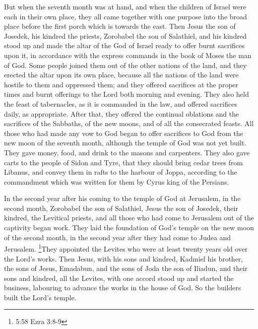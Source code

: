  But when the seventh month was at hand, and when the
children of Israel were each in their own place, they all came together
with one purpose into the broad place before the first porch which is
towards the east.  Then Jesus the son of Josedek, his
kindred the priests, Zorobabel the son of Salathiel, and his kindred
stood up and made the altar of the God of Israel ready  to
offer burnt sacrifices upon it, in accordance with the express commands
in the book of Moses the man of God.  Some people joined
them out of the other nations of the land, and they erected the altar
upon its own place, because all the nations of the land were hostile to
them and oppressed them; and they offered sacrifices at the proper times
and burnt offerings to the Lord both morning and evening. 
They also held the feast of tabernacles, as it is commanded in the law,
and offered sacrifices daily, as appropriate.  After that,
they offered the continual oblations and the sacrifices of the Sabbaths,
of the new moons, and of all the consecrated feasts.  All
those who had made any vow to God began to offer sacrifices to God from
the new moon of the seventh month, although the temple of God was not
yet built.  They gave money, food, and drink to the masons
and carpenters.  They also gave carts to the people of
Sidon and Tyre, that they should bring cedar trees from Libanus, and
convey them in rafts to the harbour of Joppa, according to the
commandment which was written for them by Cyrus king of the Persians.

 In the second year after his coming to the temple of God
at Jerusalem, in the second month, Zorobabel the son of Salathiel, Jesus
the son of Josedek, their kindred, the Levitical priests, and all those
who had come to Jerusalem out of the captivity began work. 
They laid the foundation of God's temple on the new moon of the second
month, in the second year after they had come to Judea and Jerusalem.
 \footnote{5:58 Ezra 3:8-9}They appointed the Levites who
were at least twenty years old over the Lord's works. Then Jesus, with
his sons and kindred, Kadmiel his brother, the sons of Jesus, Emadabun,
and the sons of Joda the son of Iliadun, and their sons and kindred, all
the Levites, with one accord stood up and started the business,
labouring to advance the works in the house of God. So the builders
built the Lord's temple.

